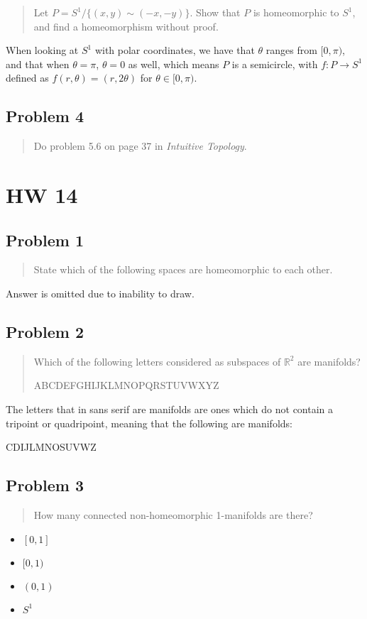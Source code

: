\documentclass[8pt]{extarticle}
\begin{document}
{\begin{quote}
	Let $P = S^{1}/\{(x,y)\sim(-x,-y)\}$. Show that $P$ is homeomorphic to $S^{1}$, and find a homeomorphism without proof.
\end{quote}
When looking at $S^1$ with polar coordinates, we have that $\theta$ ranges from $[0,\pi)$, and that when $\theta = \pi$, $\theta = 0$ as well, which means $P$ is a semicircle, with $f:P\rightarrow S^1$ defined as $f(r,\theta) = (r,2\theta)$ for $\theta\in[0,\pi)$.
\subsection*{Problem 4}%

\begin{quote}
	Do problem 5.6 on page 37 in \textit{Intuitive Topology}.
\end{quote}
\pagebreak
\section*{HW 14}%

\subsection*{Problem 1}%
\begin{quote}
	State which of the following spaces are homeomorphic to each other.
\end{quote}
Answer is omitted due to inability to draw.
\subsection*{Problem 2}%
\begin{quote}
	Which of the following letters considered as subspaces of $\mathbb{R}^2$ are manifolds?
	\begin{center}
		\textsf{ABCDEFGHIJKLMNOPQRSTUVWXYZ}
	\end{center}
\end{quote}
The letters that in sans serif are manifolds are ones which do not contain a tripoint or quadripoint, meaning that the following are manifolds:
\begin{center}
	\textsf{CDIJLMNOSUVWZ}
\end{center}
\subsection*{Problem 3}%
\begin{quote}
	How many connected non-homeomorphic 1-manifolds are there?
\end{quote}
\begin{itemize}
	\item $[0,1]$
	\item $[0,1)$
	\item $(0,1)$
	\item $S^1$
\end{itemize}
}
\end{document}

